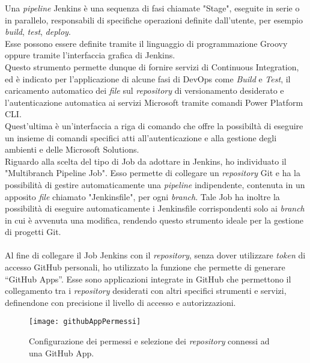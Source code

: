 \newpage \noindent Una \emph{pipeline} Jenkins è una sequenza di fasi chiamate "Stage", eseguite in serie o in parallelo, responsabili di specifiche operazioni definite dall'utente, per esempio \emph{build}, \emph{test}, \emph{deploy}.\\
Esse possono essere definite tramite il linguaggio di programmazione Groovy oppure tramite l'interfaccia grafica di Jenkins.\\
Questo strumento permette dunque di fornire servizi di \gls{Continuous Integration}, ed è indicato per l'applicazione di alcune fasi di \gls{DevOps} come \emph{Build} e \emph{Test}, il caricamento automatico dei \emph{file} sul \emph{repository} di versionamento desiderato e l'autenticazione automatica ai servizi Microsoft tramite comandi Power Platform CLI.\\
Quest'ultima è un'interfaccia a riga di comando che offre la possibiltà di eseguire un insieme di comandi specifici atti all'autenticazione e alla gestione degli ambienti e delle Microsoft Solutions.\\
Riguardo alla scelta del tipo di Job da adottare in Jenkins, ho individuato il "Multibranch Pipeline Job".
Esso permette di collegare un \emph{repository} Git e ha la possibilità di gestire automaticamente una \emph{pipeline} indipendente, contenuta in un apposito \emph{file} chiamato "Jenkinsfile", per ogni \emph{branch}.
Tale Job ha inoltre la possibilità di eseguire automaticamente i Jenkinsfile corrispondenti solo ai \emph{branch} in cui è avvenuta una modifica, rendendo questo strumento ideale per la gestione di progetti Git.\\\\
Al fine di collegare il Job Jenkins con il \emph{repository}, senza dover utilizzare \emph{token} di accesso GitHub personali, ho utilizzato la funzione che permette di generare “GitHub Apps”.
Esse sono applicazioni integrate in GitHub che permettono il collegamento tra i \emph{repository} desiderati con altri specifici strumenti e servizi, definendone con precisione il livello di accesso e autorizzazioni.  
\begin{figure}[htbp] 
    \centering 
    \texttt{[image: githubAppPermessi]} 
    \caption{Configurazione dei permessi e selezione dei \emph{repository} connessi ad una GitHub App.}
    \label{fig:githubAppPermessi}
\end{figure}

